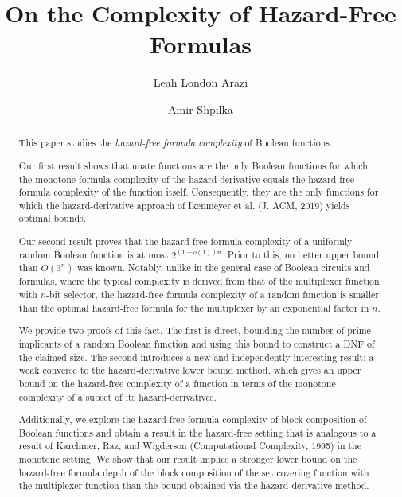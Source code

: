 \documentclass[acmsmall, nonacm, authorversion]{acmart}
\begin{document}
\title{On the Complexity of Hazard-Free Formulas}

\author{Leah {London Arazi}}

\author{Amir {Shpilka}}
\authornotemark[1]

\renewcommand{\shortauthors}{Leah London Arazi and Amir Shpilka}

\begin{abstract}
This paper studies the \emph{hazard-free formula complexity} of Boolean functions.

Our first result shows that unate functions are the only Boolean functions for which the monotone formula complexity of the hazard-derivative equals the hazard-free formula complexity of the function itself. Consequently, they are the only functions for which the hazard-derivative approach of Ikenmeyer et al. (J. ACM, 2019) yields optimal bounds. 

Our second result proves that the hazard-free formula complexity of a uniformly random Boolean function is at most $2^{(1+o(1))n}$. Prior to this, no better upper bound than $O(3^n)$ was known. 
Notably, unlike in the general case of Boolean circuits and formulas, where the typical complexity is derived from that of the multiplexer function with $n$-bit selector, the hazard-free formula complexity of a random function is smaller than the optimal hazard-free formula for the multiplexer by an exponential factor in $n$.

We provide two proofs of this fact. The first is direct, bounding the number of prime implicants of a random Boolean function and using this bound to construct a DNF of the claimed size. The second introduces a new and independently interesting result: a weak converse to the hazard-derivative lower bound method, which gives an upper bound on the hazard-free complexity of a function in terms of the monotone complexity of a subset of its hazard-derivatives. 

Additionally, we explore the hazard-free formula complexity of block composition of Boolean functions and obtain a result in the hazard-free setting that is analogous to a result of Karchmer, Raz, and Wigderson (Computational Complexity, 1995) in the monotone setting. 
We show that our result implies a stronger lower bound on the hazard-free formula depth of the block composition of the set covering function with the multiplexer function than the bound obtained via the hazard-derivative method.
\end{abstract}
\end{document}
